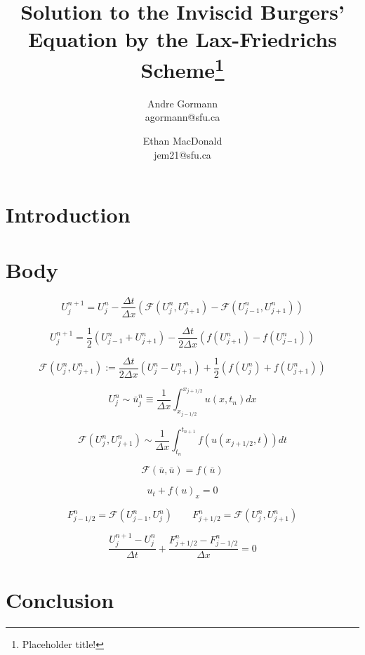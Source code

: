 \documentclass{myproject}
\title{\vspace*{-1cm}Solution to the Inviscid Burgers' Equation by the Lax-Friedrichs Scheme\footnote{Placeholder title!}}
\date{}
\author{
    Andre Gormann\\
    agormann@sfu.ca
    \and
    Ethan MacDonald\\
    jem21@sfu.ca
}
\begin{document}
\maketitle
\vspace*{-1cm}


\section{Introduction}

\section{Body}

\[
    U_j^{n+1} = U_j^n - \frac{\Delta t}{\Delta x} \left( \mathcal{F}(U_{j}^{n}, U_{j+1}^{n}) - \mathcal{F}(U_{j-1}^{n}, U_{j+1}^{n}) \right)
\]

\[
    U_j^{n+1} = \frac{1}{2}\left( U_{j-1}^{n} + U_{j+1}^{n} \right) - \frac{\Delta t}{2\Delta x}\left( f(U_{j+1}^{n}) - f(U_{j-1}^{n}) \right)
\]

\[
    \mathcal{F}(U_j^n, U_{j+1}^n) := \frac{\Delta t}{2\Delta x}(U_j^n - U_{j+1}^n) + \frac{1}{2}\left( f(U_j^n) + f(U_{j+1}^n) \right)
\]

\[
    U_j^n \sim \bar{u}_j^n \equiv \frac{1}{\Delta x} \int_{x_{j-1/2}}^{x_{j+1/2}} u(x,t_n) dx
\]

\[
    \mathcal{F}(U_j^n, U_{j+1}^n) \sim \frac{1}{\Delta x} \int_{t_n}^{t_{n+1}} f(u(x_{j+1/2}, t)) dt
\]

\[
    \mathcal{F}(\bar{u}, \bar{u}) = f(\bar{u})
\]

\[
    u_t + f(u)_x = 0
\]

\[
    F_{j-1/2}^n = \mathcal{F}(U_{j-1}^n, U_j^n) \qquad F_{j+1/2}^n = \mathcal{F}(U_{j}^n, U_{j+1}^n)
\]

\[
    \frac{U_j^{n+1} - U_j^n}{\Delta t} + \frac{F_{j+1/2}^n - F_{j-1/2}^n}{\Delta x} = 0
\]


\section{Conclusion}

\nocite{iserles2009}
\nocite{trefethen2000}
\nocite{leveque1992}
\nocite{leveque2002}
\printbibliography
\end{document}
